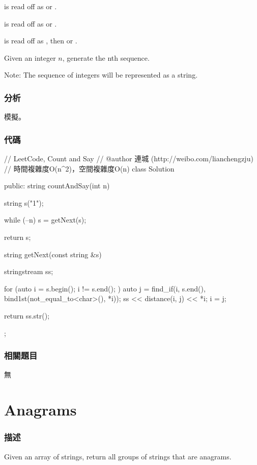  is read off as  or .

 is read off as  or .

 is read off as , then  or .

Given an integer $n$, generate the nth sequence.

Note: The sequence of integers will be represented as a string.


\subsubsection{分析}
模擬。


\subsubsection{代碼}
\begin{Code}
// LeetCode, Count and Say
// @author 連城 (http://weibo.com/lianchengzju)
// 時間複雜度O(n^2)，空間複雜度O(n)
class Solution {
public:
    string countAndSay(int n) {
        string s("1");

        while (--n)
            s = getNext(s);

        return s;
    }

    string getNext(const string &s) {
        stringstream ss;

        for (auto i = s.begin(); i != s.end(); ) {
            auto j = find_if(i, s.end(), bind1st(not_equal_to<char>(), *i));
            ss << distance(i, j) << *i;
            i = j;
        }

        return ss.str();
    }
};
\end{Code}


\subsubsection{相關題目}
\begindot
\item 無
\myenddot


\section{Anagrams} %
\label{sec:anagrams}


\subsubsection{描述}
Given an array of strings, return all groups of strings that are anagrams.

